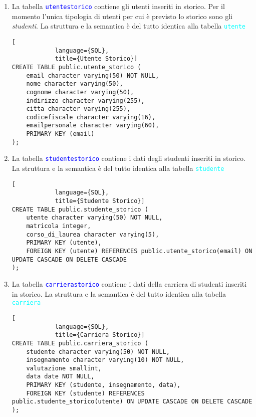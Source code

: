 \documentclass{article}
\newcommand{\tabb}[1]{\texttt{\textcolor{blue}{#1}}}
\newcommand{\tab}[1]{\texttt{\textcolor{cyan}{#1}}}
\newcommand{\und}[0]{\textunderscore}
\begin{document}
\begin{enumerate}
        \item La tabella \tabb{utente\und storico} contiene gli utenti inseriti in storico. Per il momento l'unica tipologia di utenti per cui è previsto lo storico sono gli \textit{studenti}. La struttura e la semantica è del tutto identica alla tabella \tab{utente}
        \begin{lstlisting}[
            language={SQL},
            title={Utente Storico}]
CREATE TABLE public.utente_storico (
    email character varying(50) NOT NULL,
    nome character varying(50),
    cognome character varying(50),
    indirizzo character varying(255),
    citta character varying(255),
    codicefiscale character varying(16),
    emailpersonale character varying(60),
    PRIMARY KEY (email)
);
        \end{lstlisting}

        \item La tabella \tabb{studente\und storico} contiene i dati degli studenti inseriti in storico. La struttura e la semantica è del tutto identica alla tabella \tab{studente}
        \begin{lstlisting}[
            language={SQL},
            title={Studente Storico}]
CREATE TABLE public.studente_storico (
    utente character varying(50) NOT NULL,
    matricola integer,
    corso_di_laurea character varying(5),
    PRIMARY KEY (utente),
    FOREIGN KEY (utente) REFERENCES public.utente_storico(email) ON UPDATE CASCADE ON DELETE CASCADE
);
        \end{lstlisting}

        \item La tabella \tabb{carriera\und storico} contiene i dati della carriera di studenti inseriti in storico. La struttura e la semantica è del tutto identica alla tabella \tab{carriera}
        \begin{lstlisting}[
            language={SQL},
            title={Carriera Storico}]
CREATE TABLE public.carriera_storico (
    studente character varying(50) NOT NULL,
    insegnamento character varying(10) NOT NULL,
    valutazione smallint,
    data date NOT NULL,
    PRIMARY KEY (studente, insegnamento, data),
    FOREIGN KEY (studente) REFERENCES public.studente_storico(utente) ON UPDATE CASCADE ON DELETE CASCADE
);
        \end{lstlisting}


\end{enumerate}
\end{document}
